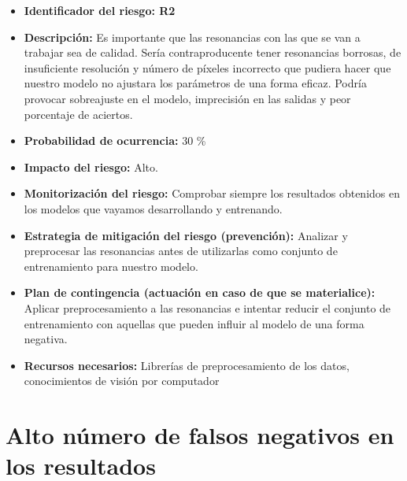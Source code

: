 \begin{itemize}
	\item \textbf{Identificador del riesgo: R2 }
	\item \textbf{Descripción: } Es importante que las resonancias con las que se van a trabajar sea de calidad. Sería contraproducente tener resonancias borrosas, de insuficiente resolución y número de píxeles incorrecto que pudiera hacer que nuestro modelo no ajustara los parámetros de una forma eficaz. Podría provocar sobreajuste en el modelo, imprecisión en las salidas y peor porcentaje de aciertos.
	\item \textbf{Probabilidad de ocurrencia: } 30 \%
	\item \textbf{Impacto del riesgo: } Alto.
	\item \textbf{Monitorización del riesgo: } Comprobar siempre los resultados obtenidos en los modelos que vayamos desarrollando y entrenando. 
	\item \textbf{Estrategia de mitigación del riesgo (prevención): }  Analizar y preprocesar las resonancias antes de utilizarlas como conjunto de entrenamiento para nuestro modelo.
	\item \textbf{Plan de contingencia (actuación en caso de que se materialice): } Aplicar preprocesamiento a las resonancias e intentar reducir el conjunto de entrenamiento con aquellas que pueden influir al modelo de una forma negativa. 
	\item \textbf{Recursos necesarios: } Librerías de preprocesamiento de los datos, conocimientos de visión por computador
\end{itemize}

\section{Alto número de falsos negativos en los resultados}

